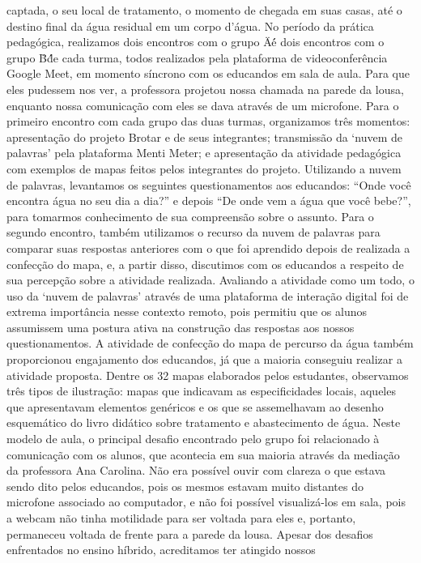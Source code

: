captada, o seu local de tratamento, o momento de chegada em suas casas, até o destino final
da água residual em um corpo d’água.
No período da prática pedagógica, realizamos dois encontros com o grupo \"A\'\' e dois
encontros com o grupo \"B\'\' de cada turma, todos realizados pela plataforma de
videoconferência Google Meet, em momento síncrono com os educandos em sala de aula.
Para que eles pudessem nos ver, a professora projetou nossa chamada na parede da lousa,
enquanto nossa comunicação com eles se dava através de um microfone.
Para o primeiro encontro com cada grupo das duas turmas, organizamos três
momentos: apresentação do projeto Brotar e de seus integrantes; transmissão da ‘nuvem de
palavras’ pela plataforma Menti Meter; e apresentação da atividade pedagógica com
exemplos de mapas feitos pelos integrantes do projeto. Utilizando a nuvem de palavras,
levantamos os seguintes questionamentos aos educandos: “Onde você encontra água no seu
dia a dia?” e depois “De onde vem a água que você bebe?”, para tomarmos conhecimento de
sua compreensão sobre o assunto. Para o segundo encontro, também utilizamos o recurso da
nuvem de palavras para comparar suas respostas anteriores com o que foi aprendido depois de
realizada a confecção do mapa, e, a partir disso, discutimos com os educandos a respeito de
sua percepção sobre a atividade realizada.
Avaliando a atividade como um todo, o uso da ‘nuvem de palavras’ através de uma
plataforma de interação digital foi de extrema importância nesse contexto remoto, pois
permitiu que os alunos assumissem uma postura ativa na construção das respostas aos nossos
questionamentos. A atividade de confecção do mapa de percurso da água também
proporcionou engajamento dos educandos, já que a maioria conseguiu realizar a atividade
proposta. Dentre os 32 mapas elaborados pelos estudantes, observamos três tipos de
ilustração: mapas que indicavam as especificidades locais, aqueles que apresentavam
elementos genéricos e os que se assemelhavam ao desenho esquemático do livro didático
sobre tratamento e abastecimento de água.
Neste modelo de aula, o principal desafio encontrado pelo grupo foi relacionado à
comunicação com os alunos, que acontecia em sua maioria através da mediação da professora
Ana Carolina. Não era possível ouvir com clareza o que estava sendo dito pelos educandos,
pois os mesmos estavam muito distantes do microfone associado ao computador, e não foi
possível visualizá-los em sala, pois a webcam não tinha motilidade para ser voltada para eles
e, portanto, permaneceu voltada de frente para a parede da lousa.
Apesar dos desafios enfrentados no ensino híbrido, acreditamos ter atingido nossos
